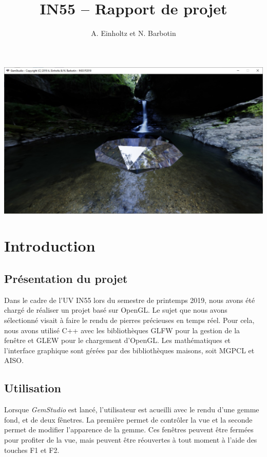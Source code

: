 \documentclass[a4paper,12pt]{article}
\title{IN55 -- Rapport de projet}
\author{A. Einholtz et N. Barbotin}
\begin{document}
\setlength{\parindent}{0cm}
\setlength{\parskip}{8pt}

\begin{center}
    \Huge\thetitle

    \vfill
    \includegraphics[width=15cm]{screenshot.jpg}
    \vfill
\end{center}

\newpage
\tableofcontents

\newpage
\section{Introduction}
\subsection{Présentation du projet}
Dans le cadre de l'UV IN55 lors du semestre de printemps 2019, nous avons été chargé de réaliser
un projet basé sur OpenGL. Le sujet que nous avons sélectionné visait à faire le rendu de pierres
précieuses en temps réel. Pour cela, nous avons utilisé C++ avec les bibliothèques GLFW pour la
gestion de la fenêtre et GLEW pour le chargement d'OpenGL. Les mathématiques et l'interface graphique
sont gérées par des bibliothèques maisons, soit MGPCL et AISO.

\subsection{Utilisation}
Lorsque \emph{GemStudio} est lancé, l'utilisateur est acueilli avec le rendu d'une gemme fond, et de
deux fênetres. La première permet de contrôler la vue et la seconde permet de modifier l'apparence de
la gemme. Ces fenêtres peuvent être fermées pour profiter de la vue, mais peuvent être réouvertes à tout
moment à l'aide des touches F1 et F2.
\end{document}
